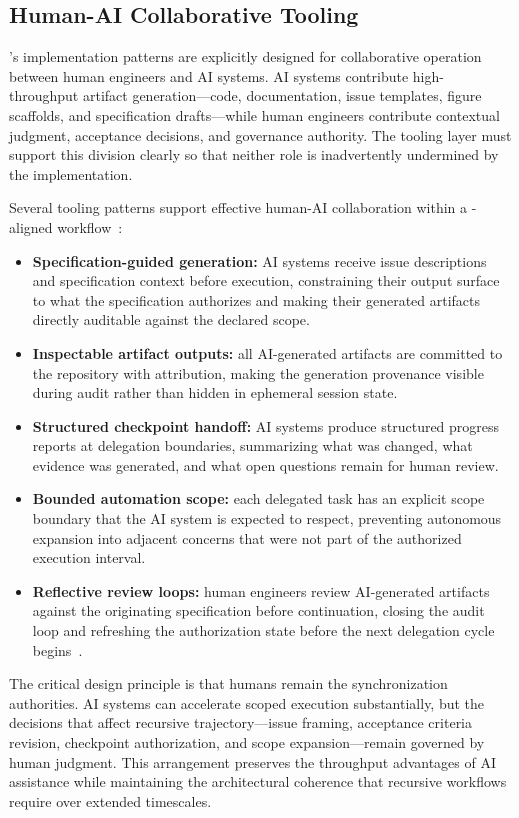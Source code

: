 \subsection{Human-AI Collaborative Tooling}

's implementation patterns are explicitly designed for collaborative operation between human engineers and AI systems. AI systems contribute high-throughput artifact generation---code, documentation, issue templates, figure scaffolds, and specification drafts---while human engineers contribute contextual judgment, acceptance decisions, and governance authority. The tooling layer must support this division clearly so that neither role is inadvertently undermined by the implementation.

Several tooling patterns support effective human-AI collaboration within a -aligned workflow~\cite{Amershi2014InteractiveML,Shneiderman2020HCAI}:
\begin{itemize}
  \item \textbf{Specification-guided generation:} AI systems receive issue descriptions and specification context before execution, constraining their output surface to what the specification authorizes and making their generated artifacts directly auditable against the declared scope.
  \item \textbf{Inspectable artifact outputs:} all AI-generated artifacts are committed to the repository with attribution, making the generation provenance visible during audit rather than hidden in ephemeral session state.
  \item \textbf{Structured checkpoint handoff:} AI systems produce structured progress reports at delegation boundaries, summarizing what was changed, what evidence was generated, and what open questions remain for human review.
  \item \textbf{Bounded automation scope:} each delegated task has an explicit scope boundary that the AI system is expected to respect, preventing autonomous expansion into adjacent concerns that were not part of the authorized execution interval.
  \item \textbf{Reflective review loops:} human engineers review AI-generated artifacts against the originating specification before continuation, closing the audit loop and refreshing the authorization state before the next delegation cycle begins~\cite{Sweller1988CognitiveLoad,Hutchins1995CognitionWild}.
\end{itemize}

The critical design principle is that humans remain the synchronization authorities. AI systems can accelerate scoped execution substantially, but the decisions that affect recursive trajectory---issue framing, acceptance criteria revision, checkpoint authorization, and scope expansion---remain governed by human judgment. This arrangement preserves the throughput advantages of AI assistance while maintaining the architectural coherence that recursive workflows require over extended timescales.

